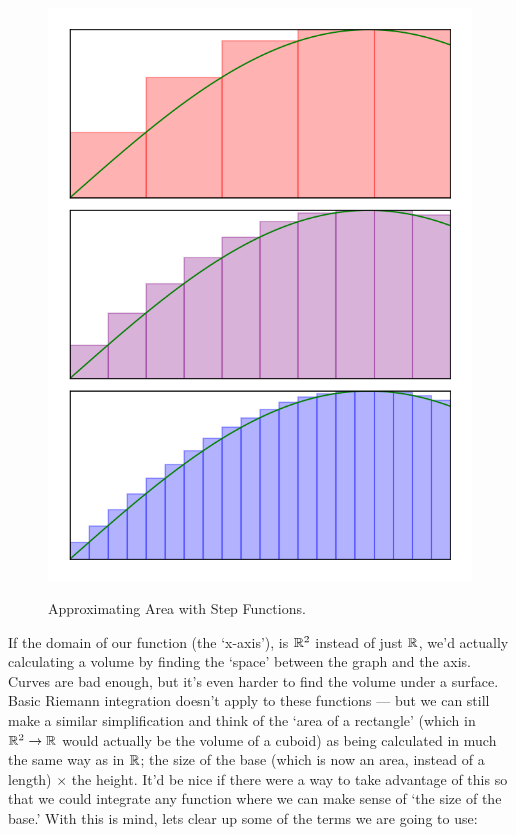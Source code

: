 \begin{figure}[H]
{		\includegraphics{Code/Area4.png}}
	\caption{Approximating Area with Step Functions.}
	\label{fig:areaapprox}
\end{figure}


If the domain of our function (the `x-axis'), is $\mathbb{R}^2$ instead of just $\mathbb{R}$, we'd actually calculating a volume by finding the `space' between the graph and the axis. Curves are bad enough, but it's even harder to find the volume under a surface. Basic Riemann integration doesn't apply to these functions --- but we can still make a similar simplification and think of the `area of a rectangle' (which in $\mathbb{R}^2 \rightarrow \mathbb{R}$ would actually be the volume of a cuboid) as being calculated in much the same way as in $\mathbb{R}$; the size of the base (which is now an area, instead of a length) $\times$ the height. It'd be nice if there were a way to take advantage of this so that we could integrate any function where we can make sense of `the size of the base.' With this is mind, lets clear up some of the terms we are going to use:

